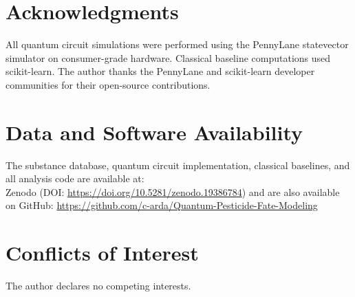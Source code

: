 \documentclass[12pt,a4paper]{article}
\begin{document}
\section*{Acknowledgments}

All quantum circuit simulations were performed using the PennyLane
statevector simulator on consumer-grade hardware. Classical baseline
computations used scikit-learn. The author thanks the PennyLane and
scikit-learn developer communities for their open-source contributions.


\section*{Data and Software Availability}

The substance database, quantum circuit implementation, classical baselines,
and all analysis code are available at:\\
Zenodo (DOI: \url{https://doi.org/10.5281/zenodo.19386784})
and are also available on GitHub:
\url{https://github.com/c-arda/Quantum-Pesticide-Fate-Modeling}


\section*{Conflicts of Interest}

The author declares no competing interests.




\end{document}
